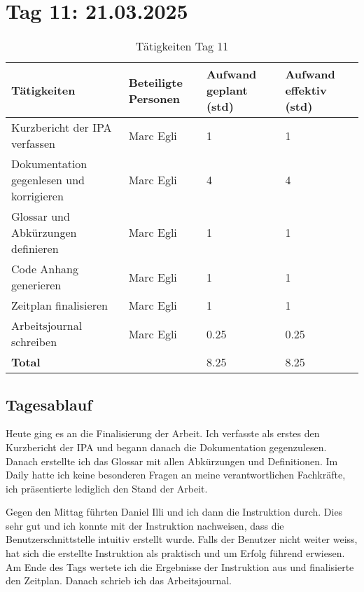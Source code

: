 \section{Tag 11: 21.03.2025}
\begin{table}[H]
    \begin{tabular}{|L{0.4\textwidth}|C{60pt}|C{60pt}|C{60pt}|}
        \hline
        \color{white}Tätigkeiten & \color{white}Beteiligte \color{white}Personen & \color{white}Aufwand geplant (std) & \color{white}Aufwand effektiv (std) \\
        \hline
         Kurzbericht der IPA verfassen & Marc Egli & 1 & 1 \\
        \hline
        Dokumentation gegenlesen und korrigieren & Marc Egli & 4 & 4 \\
        \hline
        Glossar und Abkürzungen definieren & Marc Egli & 1 & 1 \\
        \hline
        Code Anhang generieren & Marc Egli & 1 & 1 \\
        \hline
        Zeitplan finalisieren & Marc Egli & 1 & 1 \\
        \hline
        Arbeitsjournal schreiben & Marc Egli & 0.25 & 0.25 \\
        \hline
        \textbf{Total} &  & 8.25 & 8.25 \\
        \hline
    \end{tabular}
    \caption{Tätigkeiten Tag 11}
\end{table}

\subsection*{Tagesablauf}
Heute ging es an die Finalisierung der Arbeit. Ich verfasste als erstes den Kurzbericht der IPA und begann danach 
die Dokumentation gegenzulesen. Danach erstellte ich das Glossar mit allen Abkürzungen und Definitionen. Im Daily hatte ich keine 
besonderen Fragen an meine verantwortlichen Fachkräfte, ich präsentierte lediglich den Stand der Arbeit.

Gegen den Mittag führten Daniel Illi und ich dann die Instruktion durch. Dies sehr gut und ich konnte mit der Instruktion nachweisen, dass 
die Benutzerschnittstelle intuitiv erstellt wurde. Falls der Benutzer nicht weiter weiss, hat sich die erstellte Instruktion als praktisch und um Erfolg führend
erwiesen. Am Ende des Tags wertete ich die Ergebnisse der Instruktion aus und finalisierte den Zeitplan. Danach schrieb ich das Arbeitsjournal.

